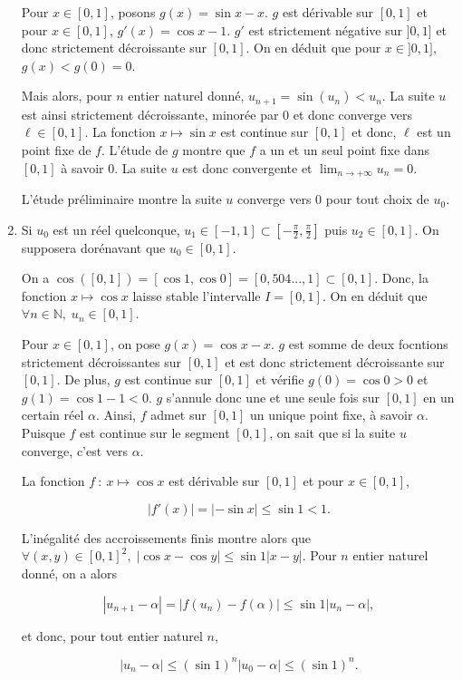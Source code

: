 \documentclass[11pt,a4paper]{article}
\newcommand{\Nn}{\mathbb{N}} \newcommand{\N}{\mathbb{N}}
\begin{document}
\begin{enumerate}
Pour $x\in[0,1]$, posons $g(x)=\sin x-x$. $g$ est dérivable sur $[0,1]$ et pour $x\in[0,1]$, $g'(x)=\cos x-1$. $g'$ est strictement négative sur $]0,1]$ et donc strictement décroissante sur $[0,1]$. On en déduit que pour $x\in]0,1]$, $g(x)<g(0)=0$.

Mais alors, pour $n$ entier naturel donné, $u_{n+1}=\sin(u_n)<u_n$. La suite $u$ est ainsi strictement décroissante, minorée par $0$ et donc converge vers $\ell\in[0,1]$. La fonction $x\mapsto\sin x$ est continue sur $[0,1]$ et donc, $\ell$ est un point fixe de $f$. L'étude de $g$ montre que $f$ a un et un seul point fixe dans $[0,1]$ à savoir $0$. La suite $u$ est donc convergente et $\lim_{n\rightarrow +\infty}u_n=0$.

L'étude préliminaire montre la suite $u$ converge vers $0$ pour tout choix de $u_0$.



\item  Si $u_0$ est un réel quelconque, $u_1\in[-1,1]\subset[-\frac{\pi}{2},\frac{\pi}{2}]$ puis $u_2\in[0,1]$. On supposera dorénavant que $u_0\in[0,1]$.

On a $\cos([0,1])=[\cos 1,\cos0]=[0,504...,1]\subset[0,1]$. Donc, la fonction $x\mapsto\cos x$ laisse stable l'intervalle $I=[0,1]$. On en déduit que $\forall n\in\Nn,\;u_n\in[0,1]$.

Pour $x\in[0,1]$, on pose $g(x)=\cos x-x$. $g$ est somme de deux focntions strictement décroissantes sur $[0,1]$ et est donc strictement décroissante sur $[0,1]$. De plus, $g$ est continue sur $[0,1]$ et vérifie $g(0)=\cos0>0$ et $g(1)=\cos1-1<0$. $g$ s'annule donc une et une seule fois sur $[0,1]$ en un certain réel $\alpha$. Ainsi, $f$ admet sur $[0,1]$ un unique point fixe, à savoir $\alpha$. Puisque $f$ est continue sur le segment $[0,1]$, on sait que si la suite $u$ converge, c'est vers $\alpha$.

La fonction $f~:~x\mapsto\cos x$ est dérivable sur $[0,1]$ et pour $x\in[0,1]$,

$$|f'(x)|=|-\sin x|\leq\sin1<1.$$

L'inégalité des accroissements finis montre alors que $\forall(x,y)\in[0,1]^2,\;|\cos x-\cos y|\leq\sin1|x-y|$. Pour $n$ entier naturel donné, on a alors

$$|u_{n+1}-\alpha|=|f(u_n)-f(\alpha)|\leq\sin1|u_n-\alpha|,$$

et donc, pour tout entier naturel $n$,

$$|u_n-\alpha|\leq(\sin1)^n|u_0-\alpha|\leq(\sin1)^n.$$


\end{enumerate}
\end{document}
